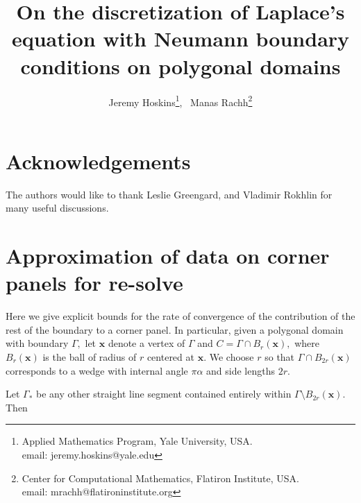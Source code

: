 \documentclass[12pt]{article}
\newcommand{\bx}{\boldsymbol{x}}
\begin{document}
 \title{On the discretization of Laplace's equation with Neumann boundary conditions on polygonal domains}
\author{Jeremy Hoskins\thanks{Applied Mathematics Program, Yale University, USA. \\ email: jeremy.hoskins@yale.edu}, \,
Manas Rachh\thanks{Center for Computational Mathematics, Flatiron Institute, USA. \\ email: mrachh@flatironinstitute.org}}
 \maketitle









\section{Acknowledgements}
The authors would like to thank Leslie Greengard, and Vladimir Rokhlin for many useful discussions.

\appendix
\section{Approximation of data on corner panels for re-solve}
Here we give explicit bounds for the rate of convergence of the contribution of the rest of the boundary to a corner panel. In particular, given a polygonal domain with boundary $\Gamma,$ let $\bx$ denote a vertex of $\Gamma$ and $C = \Gamma \cap B_r(\bx),$ where $B_r(\bx)$ is the ball of radius of $r$ centered at $\bx.$ We choose $r$ so that $\Gamma \cap B_{2r}(\bx)$ corresponds to a wedge with internal angle $\pi \alpha$ and side lengths $2r.$ 

Let $\Gamma_*$ be any other straight line segment contained entirely within $\Gamma \setminus B_{2r}(\bx).$ Then
\end{document}
